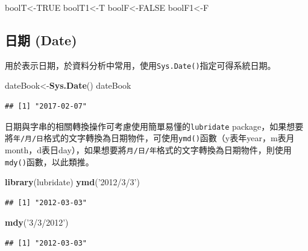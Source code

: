 \documentclass[]{book}
\newenvironment{Shaded}{\begin{snugshade}}{\end{snugshade}}
\newcommand{\KeywordTok}[1]{\textcolor[rgb]{0.13,0.29,0.53}{\textbf{{#1}}}}
\newcommand{\StringTok}[1]{\textcolor[rgb]{0.31,0.60,0.02}{{#1}}}
\newcommand{\OtherTok}[1]{\textcolor[rgb]{0.56,0.35,0.01}{{#1}}}
\newcommand{\NormalTok}[1]{{#1}}
\theoremstyle{definition}
\theoremstyle{definition}
\theoremstyle{remark}
\begin{document}
\begin{Shaded}
\begin{Highlighting}[]
\NormalTok{boolT<-}\OtherTok{TRUE}
\NormalTok{boolT1<-T}
\NormalTok{boolF<-}\OtherTok{FALSE}
\NormalTok{boolF1<-F}
\end{Highlighting}
\end{Shaded}

\subsection{日期 (Date)}\label{-date}

用於表示日期，於資料分析中常用，使用\texttt{Sys.Date()}指定可得系統日期。

\begin{Shaded}
\begin{Highlighting}[]
\NormalTok{dateBook<-}\KeywordTok{Sys.Date}\NormalTok{()}
\NormalTok{dateBook}
\end{Highlighting}
\end{Shaded}

\begin{verbatim}
## [1] "2017-02-07"
\end{verbatim}

日期與字串的相關轉換操作可考慮使用簡單易懂的\texttt{lubridate}\citep{R-lubridate}
package，如果想要將\texttt{年/月/日}格式的文字轉換為日期物件，可使用\texttt{ymd()}函數（y表年year，m表月month，d表日day），如果想要將\texttt{月/日/年}格式的文字轉換為日期物件，則使用\texttt{mdy()}函數，以此類推。

\begin{Shaded}
\begin{Highlighting}[]
\KeywordTok{library}\NormalTok{(lubridate)}
\KeywordTok{ymd}\NormalTok{(}\StringTok{'2012/3/3'}\NormalTok{)}
\end{Highlighting}
\end{Shaded}

\begin{verbatim}
## [1] "2012-03-03"
\end{verbatim}

\begin{Shaded}
\begin{Highlighting}[]
\KeywordTok{mdy}\NormalTok{(}\StringTok{'3/3/2012'}\NormalTok{)}
\end{Highlighting}
\end{Shaded}

\begin{verbatim}
## [1] "2012-03-03"
\end{verbatim}
\end{document}
